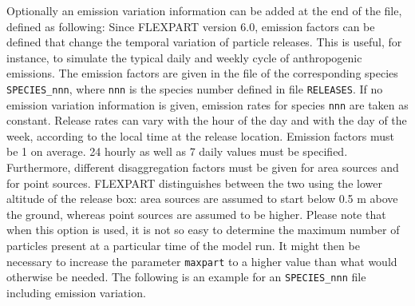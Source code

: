 \documentclass{egu}            %
\begin{document}
Optionally an emission variation information can be added at the end of the
file, defined as following: Since FLEXPART version 6.0, emission factors can be
defined that change the temporal variation of particle releases.  This is
useful, for instance, to simulate the typical daily and weekly cycle of
anthropogenic emissions.  The emission factors are given in the file of the
corresponding species \verb|SPECIES_nnn|, where \verb|nnn| is the species
number defined in file \verb|RELEASES|.  If no emission variation information
is given, emission rates for species \verb|nnn| are taken as constant.  Release
rates can vary with the hour of the day and with the day of the week, according
to the local time at the release location.  Emission factors must be 1 on
average.  24 hourly as well as 7 daily values must be specified.  Furthermore,
different disaggregation factors must be given for area sources and for point
sources.  FLEXPART distinguishes between the two using the lower altitude of
the release box: area sources are assumed to start below 0.5 m above the
ground, whereas point sources are assumed to be higher.  Please note that when
this option is used, it is not so easy to determine the maximum number of
particles present at a particular time of the model run.  It might then be
necessary to increase the parameter \verb|maxpart| to a higher value than what
would otherwise be needed.  The following is an example for an
\verb|SPECIES_nnn| file including emission variation.
\end{document}
